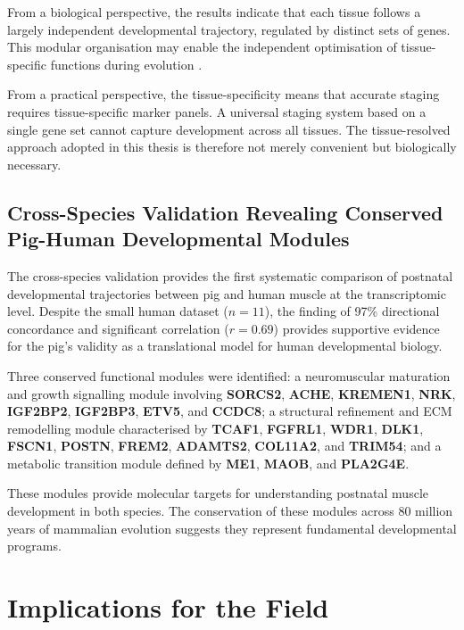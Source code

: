 From a biological perspective, the results indicate that each tissue follows a largely independent developmental trajectory, regulated by distinct sets of genes. This modular organisation may enable the independent optimisation of tissue-specific functions during evolution \parencite{cardoso-moreira_gene_2019}.

From a practical perspective, the tissue-specificity means that accurate staging requires tissue-specific marker panels. A universal staging system based on a single gene set cannot capture development across all tissues. The tissue-resolved approach adopted in this thesis is therefore not merely convenient but biologically necessary.

\subsection{Cross-Species Validation Revealing Conserved Pig-Human Developmental Modules}

The cross-species validation provides the first systematic comparison of postnatal developmental trajectories between pig and human muscle at the transcriptomic level. Despite the small human dataset \parencite{schaiter_molecular_2024} ($n = 11$), the finding of 97\% directional concordance and significant correlation ($r = 0.69$) provides supportive evidence for the pig's validity as a translational model for human developmental biology.

Three conserved functional modules were identified: a neuromuscular maturation and growth signalling module involving \textbf{SORCS2}, \textbf{ACHE}, \textbf{KREMEN1}, \textbf{NRK}, \textbf{IGF2BP2}, \textbf{IGF2BP3}, \textbf{ETV5}, and \textbf{CCDC8}; a structural refinement and ECM remodelling module characterised by \textbf{TCAF1}, \textbf{FGFRL1}, \textbf{WDR1}, \textbf{DLK1}, \textbf{FSCN1}, \textbf{POSTN}, \textbf{FREM2}, \textbf{ADAMTS2}, \textbf{COL11A2}, and \textbf{TRIM54}; and a metabolic transition module defined by \textbf{ME1}, \textbf{MAOB}, and \textbf{PLA2G4E}.

These modules provide molecular targets for understanding postnatal muscle development in both species. The conservation of these modules across 80 million years of mammalian evolution \parencite{kumar_timetree_2022} suggests they represent fundamental developmental programs.


\section{Implications for the Field}\label{sec:conclusions:implications}

